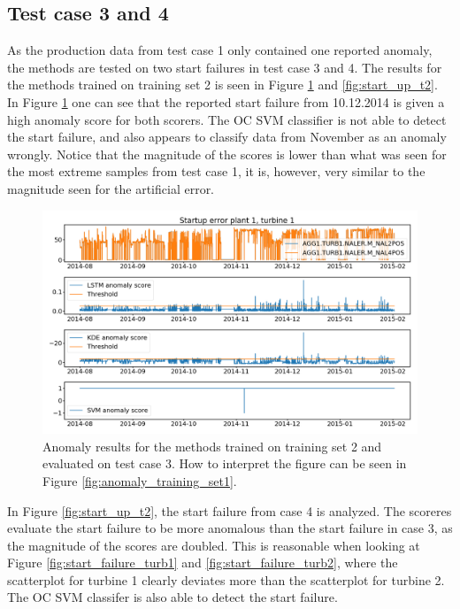     \subsection{Test case 3 and 4}
        As the production data from test case 1 only contained one reported anomaly, the methods are tested on two start failures in test case 3 and 4. The results for the methods trained on training set 2 is seen in Figure \ref{fig:start_up_t1} and \ref{fig:start_up_t2}. In Figure \ref{fig:start_up_t1} one can see that the reported start failure from 10.12.2014 is given a high anomaly score for both scorers. The OC SVM classifier is not able to detect the start failure, and also appears to classify data from November as an anomaly wrongly. Notice that the magnitude of the scores is lower than what was seen for the most extreme samples from test case 1, it is, however, very similar to the magnitude seen for the artificial error.
        \begin{figure}
            \centering
            \includegraphics[width=\textwidth]{report/figures/analysis/startup_errors/t1_n2_n4_startup_error_anomaly_score_2_long.png}
            \caption{Anomaly results for the methods trained on training set 2 and evaluated on test case 3. How to interpret the figure can be seen in Figure \ref{fig:anomaly_training_set1}.}
            \label{fig:start_up_t1}
        \end{figure}
        In Figure \ref{fig:start_up_t2}, the start failure from case 4 is analyzed. The scoreres evaluate the start failure to be more anomalous than the start failure in case 3, as the magnitude of the scores are doubled. This is reasonable when looking at Figure \ref{fig:start_failure_turb1} and \ref{fig:start_failure_turb2}, where the scatterplot for turbine 1 clearly deviates more than the scatterplot for turbine 2. The OC SVM classifer is also able to detect the start failure.

